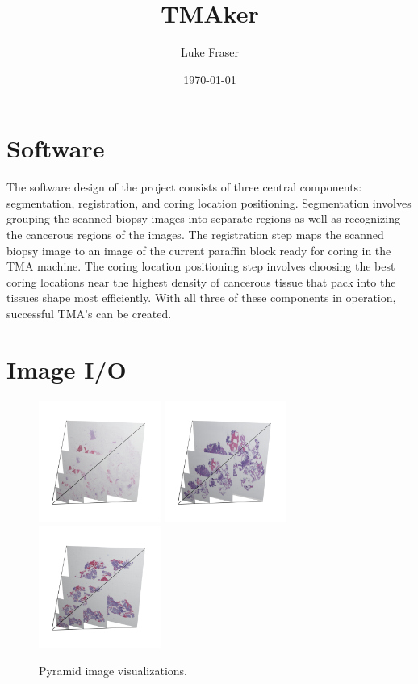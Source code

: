 \documentclass[letterpaper,10pt,oneside]{article}
\author{Luke Fraser}
\title{TMAker}
\date{\today}
\begin{document}
\section{Software}
The software design of the project consists of three central components: segmentation, registration, and coring location positioning. Segmentation involves grouping the scanned biopsy images into separate regions as well as recognizing the cancerous regions of the images. The registration step maps the scanned biopsy image to an image of the current paraffin block ready for coring in the TMA machine. The coring location positioning step involves choosing the best coring locations near the highest density of cancerous tissue that pack into the tissues shape most efficiently. With all three of these components in operation, successful TMA's can be created.

\section{Image I/O}

\begin{figure}[hbtp]
  \centering	
  \includegraphics[width=4cm]{visualization/Pyramid_PO13-00516A1_1_7_201305171148.png}
  \includegraphics[width=4cm]{visualization/Pyramid_PO13-01710A1_1_5_201312260943.png}
  \includegraphics[width=4cm]{visualization/Pyramid_PO14-00472B13_1_7_201404151132.png}
  \caption{Pyramid image visualizations.}
  \label{fig:pyramidimage}
\end{figure}
\end{document}
